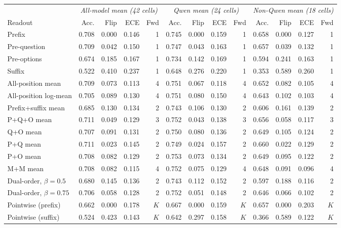 \begin{tabular}{@{}l rrrr rrrr rrrr@{}}
\toprule
& \multicolumn{4}{c}{\textit{All-model mean (42 cells)}} & \multicolumn{4}{c}{\textit{Qwen mean (24 cells)}} & \multicolumn{4}{c}{\textit{Non-Qwen mean (18 cells)}} \\
\cmidrule(lr){2-5}\cmidrule(lr){6-9}\cmidrule(l){10-13}
Readout & Acc. & Flip & ECE & Fwd & Acc. & Flip & ECE & Fwd & Acc. & Flip & ECE & Fwd \\
\midrule
Prefix & 0.708 & 0.000 & 0.146 & 1 & 0.745 & 0.000 & 0.159 & 1 & 0.658 & 0.000 & 0.127 & 1 \\
Pre-question & 0.709 & 0.042 & 0.150 & 1 & 0.747 & 0.043 & 0.163 & 1 & 0.657 & 0.039 & 0.132 & 1 \\
Pre-options & 0.674 & 0.185 & 0.167 & 1 & 0.734 & 0.142 & 0.169 & 1 & 0.594 & 0.241 & 0.163 & 1 \\
Suffix & 0.522 & 0.410 & 0.237 & 1 & 0.648 & 0.276 & 0.220 & 1 & 0.353 & 0.589 & 0.260 & 1 \\
All-position mean & 0.709 & 0.073 & 0.113 & 4 & 0.751 & 0.067 & 0.118 & 4 & 0.652 & 0.082 & 0.105 & 4 \\
All-position log-mean & 0.705 & 0.089 & 0.130 & 4 & 0.751 & 0.080 & 0.150 & 4 & 0.643 & 0.102 & 0.103 & 4 \\
Prefix+suffix mean & 0.685 & 0.130 & 0.134 & 2 & 0.743 & 0.106 & 0.130 & 2 & 0.606 & 0.161 & 0.139 & 2 \\
P+Q+O mean & 0.711 & 0.049 & 0.129 & 3 & 0.752 & 0.043 & 0.138 & 3 & 0.656 & 0.058 & 0.117 & 3 \\
Q+O mean & 0.707 & 0.091 & 0.131 & 2 & 0.750 & 0.080 & 0.136 & 2 & 0.649 & 0.105 & 0.124 & 2 \\
P+Q mean & 0.711 & 0.023 & 0.145 & 2 & 0.749 & 0.024 & 0.157 & 2 & 0.660 & 0.022 & 0.129 & 2 \\
P+O mean & 0.708 & 0.082 & 0.129 & 2 & 0.753 & 0.073 & 0.134 & 2 & 0.649 & 0.095 & 0.122 & 2 \\
M+M mean & 0.708 & 0.082 & 0.115 & 4 & 0.752 & 0.075 & 0.129 & 4 & 0.648 & 0.091 & 0.096 & 4 \\
Dual-order, $\beta{=}0.5$ & 0.680 & 0.145 & 0.136 & 2 & 0.743 & 0.112 & 0.152 & 2 & 0.597 & 0.188 & 0.116 & 2 \\
Dual-order, $\beta{=}0.75$ & 0.706 & 0.058 & 0.128 & 2 & 0.752 & 0.051 & 0.148 & 2 & 0.646 & 0.066 & 0.102 & 2 \\
Pointwise (prefix) & 0.662 & 0.000 & 0.178 & $K$ & 0.667 & 0.000 & 0.159 & $K$ & 0.657 & 0.000 & 0.203 & $K$ \\
Pointwise (suffix) & 0.524 & 0.423 & 0.143 & $K$ & 0.642 & 0.297 & 0.158 & $K$ & 0.366 & 0.589 & 0.122 & $K$ \\
\bottomrule
\end{tabular}
